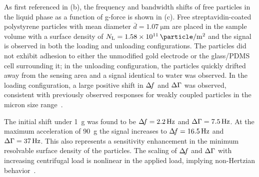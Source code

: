 As first referenced in (b), the frequency and bandwidth
shifts of free particles in the liquid phase as a function of g-force is shown
in (c).  Free streptavidin-coated polystyrene particles
with mean diameter $\bar{d}=\SI{1.07}{\micro\meter}$ are placed in the sample
volume with a surface density of
$N_\mathrm{L}=\SI{1.58e11}{\particle\per\meter\squared}$ and the signal is
observed in both the loading and unloading configurations.  The particles did
not exhibit adhesion to either the unmodified gold electrode or the glass/PDMS
cell surrounding it; in the unloading configuration, the particles quickly
drifted away from the sensing area and a signal identical to water was
observed.  In the loading configuration, a large positive shift in $\Delta\!f$ and
$\Delta\Gamma$ was observed, consistent with previously observed responses for weakly
coupled particles in the micron size range~\cite{johannsman2007contacts}.


The initial shift under \SI{1}{g} was found to be $\Delta\!f= \SI{2.2}{\hertz}$ and
$\Delta\Gamma=\SI{7.5}{\hertz}$.  At the maximum acceleration of \SI{90}{g} the signal
increases to $\Delta\!f = \SI{16.5}{\hertz}$ and $\Delta\Gamma=\SI{37}{\hertz}$.  This also
represents a sensitivity enhancement in the minimum resolvable surface density
of the particles.  The scaling of $\Delta\!f$ and $\Delta\Gamma$ with increasing centrifugal
load is nonlinear in the applied load, implying non-Hertzian
behavior~\cite{borovsky2001measuring}.


